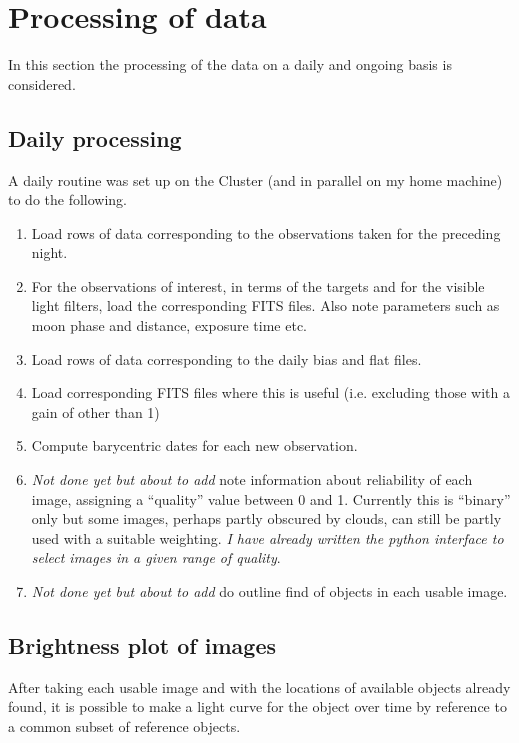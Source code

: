 \section{Processing of data}
\protect\label{section:processing}

In this section the processing of the data on a daily and ongoing basis is
considered.

\subsection{Daily processing}
\protect\label{section:dailyproc}

A daily routine was set up on the Cluster (and in parallel on my home machine)
to do the following.

\begin{enumerate}
  \item Load rows of data corresponding to the observations taken for the
  preceding night.
  \item For the observations of interest, in terms of the targets and for the
  visible light filters, load the corresponding FITS files. Also note parameters
  such as moon phase and distance, exposure time etc.
  \item Load rows of data corresponding to the daily bias and flat files.
  \item Load corresponding FITS files where this is useful (i.e. excluding
  those with a gain of other than 1)
  \item Compute barycentric dates for each new observation.
  \item \textit{Not done yet but about to add} note information about
  reliability of each image, assigning a ``quality'' value between 0 and 1.
  Currently this is ``binary'' only but some images, perhaps partly obscured by
  clouds, can still be partly used with a suitable weighting. \textit{I have
  already written the python interface to select images in a given range of
  quality}.
  \item \textit{Not done yet but about to add} do outline find of objects in
  each usable image.
\end{enumerate}

\subsection{Brightness plot of images}
\protect\label{section:recordadus}

After taking each usable image and with the locations of available objects
already found, it is possible to make a light curve for the object over time by
reference to a common subset of reference objects.

